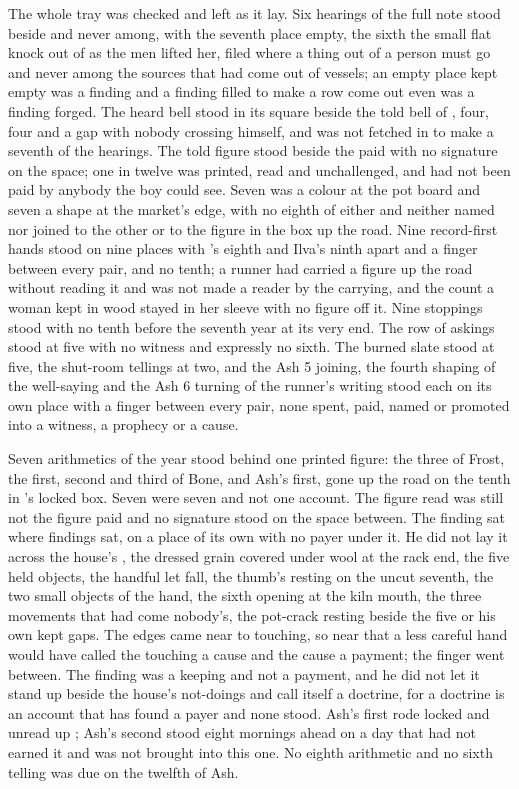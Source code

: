 The whole tray was checked and left as it lay. Six hearings of the full note stood beside and never among, with the seventh place empty, the sixth the small flat knock out of  as the men lifted her, filed where a thing out of a person must go and never among the sources that had come out of vessels; an empty place kept empty was a finding and a finding filled to make a row come out even was a finding forged. The heard bell stood in its square beside the told bell of , four, four and a gap with nobody crossing himself, and was not fetched in to make a seventh of the hearings. The told figure stood beside the paid with no signature on the space; one in twelve was printed, read and unchallenged, and had not been paid by anybody the boy could see. Seven was a colour at the pot board and seven a shape at the market's edge, with no eighth of either and neither named nor joined to the other or to the figure in the box up the road. Nine record-first hands stood on nine places with 's eighth and Ilva's ninth apart and a finger between every pair, and no tenth; a runner had carried a figure up the road without reading it and was not made a reader by the carrying, and the count a woman kept in wood stayed in her sleeve with no figure off it. Nine stoppings stood with no tenth before the seventh year at its very end. The row of askings stood at five with no witness and expressly no sixth. The burned slate stood at five, the shut-room tellings at two, and the Ash 5 joining, the fourth shaping of the well-saying and the Ash 6 turning of the runner's writing stood each on its own place with a finger between every pair, none spent, paid, named or promoted into a witness, a prophecy or a cause.

Seven arithmetics of the year stood behind one printed figure: the three of Frost, the first, second and third of Bone, and Ash's first, gone up the road on the tenth in 's locked box. Seven were seven and not one account. The figure read was still not the figure paid and no signature stood on the space between. The finding sat where findings sat, on a place of its own with no payer under it. He did not lay it across the house's , the dressed grain covered under wool at the rack end, the five held objects, the handful let fall, the thumb's resting on the uncut seventh, the two small objects of the hand, the sixth opening at the kiln mouth, the three movements that had come nobody's, the pot-crack resting beside the five or his own kept gaps. The edges came near to touching, so near that a less careful hand would have called the touching a cause and the cause a payment; the finger went between. The finding was a keeping and not a payment, and he did not let it stand up beside the house's not-doings and call itself a doctrine, for a doctrine is an account that has found a payer and none stood. Ash's first rode locked and unread up ; Ash's second stood eight mornings ahead on a day that had not earned it and was not brought into this one. No eighth arithmetic and no sixth telling was due on the twelfth of Ash.

